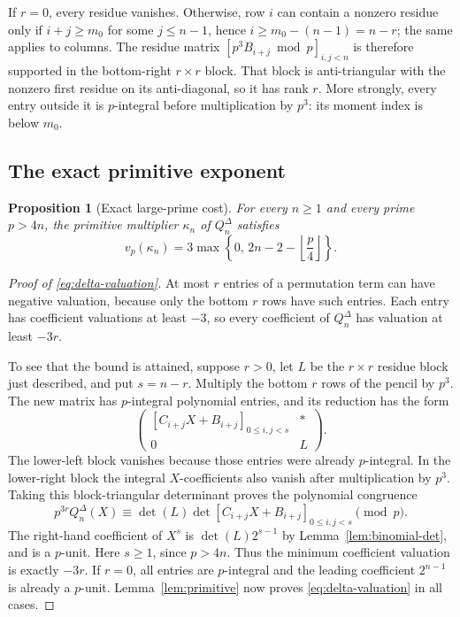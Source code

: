\documentclass[11pt]{article}
\newtheorem{proposition}[theorem]{Proposition}
\theoremstyle{definition}
\theoremstyle{remark}
\numberwithin{equation}{section}
\newcommand{\vp}{v_p}
\begin{document}
If $r=0$, every residue vanishes. Otherwise, row $i$ can contain
a nonzero residue only if $i+j\geq m_0$ for some $j\leq n-1$,
hence $i\geq m_0-(n-1)=n-r$; the same applies to columns.
The residue matrix $[p^3B_{i+j}\bmod p]_{i,j<n}$ is therefore
supported in the bottom-right $r\times r$ block.
That block is anti-triangular with the
nonzero first residue on its anti-diagonal, so it has rank $r$.
More strongly, every entry outside it is $p$-integral before multiplication
by $p^3$: its moment index is below $m_0$.

\subsection{The exact primitive exponent}

\begin{proposition}[Exact large-prime cost]\label{prop:gram-prime-cost}
For every $n\geq1$ and every prime $p>4n$, the primitive multiplier
$\kappa_n$ of $Q_n^\Delta$ satisfies
\begin{equation}\label{eq:delta-valuation}
 \vp(\kappa_n)=3\max\left\{0,\,2n-2-\left\lfloor\frac p4\right\rfloor\right\}.
\end{equation}
\end{proposition}

\begin{proof}[Proof of \eqref{eq:delta-valuation}]
At most $r$ entries of a permutation term can have negative valuation,
because only the bottom $r$ rows have such entries. Each entry has
coefficient valuations at least $-3$, so every coefficient of
$Q_n^{\Delta}$ has valuation at least $-3r$.

To see that the bound is attained, suppose $r>0$, let $L$ be the
$r\times r$ residue block just described, and put $s=n-r$.
Multiply the bottom $r$ rows of the pencil by $p^3$. The new matrix
has $p$-integral polynomial entries, and its reduction has the form
\[
 \begin{pmatrix}
 [C_{i+j}X+B_{i+j}]_{0\leq i,j<s}& *\\
 0&L
 \end{pmatrix}.
\]
The lower-left block vanishes because those entries were already
$p$-integral. In the lower-right block the integral $X$-coefficients
also vanish after multiplication by $p^3$. Taking this block-triangular
determinant proves the polynomial congruence
\begin{equation}\label{eq:block-factor}
 p^{3r}Q_n^{\Delta}(X)
 \equiv \det(L)\det[C_{i+j}X+B_{i+j}]_{0\leq i,j<s}\pmod p.
\end{equation}
The right-hand coefficient of $X^s$ is $\det(L)2^{s-1}$ by
Lemma~\ref{lem:binomial-det}, and is a $p$-unit. Here $s\geq1$,
since $p>4n$. Thus the minimum coefficient valuation is exactly $-3r$.
If $r=0$, all entries are $p$-integral and the leading coefficient
$2^{n-1}$ is already a $p$-unit. Lemma~\ref{lem:primitive} now proves
\eqref{eq:delta-valuation} in all cases.
\end{proof}
\end{document}
